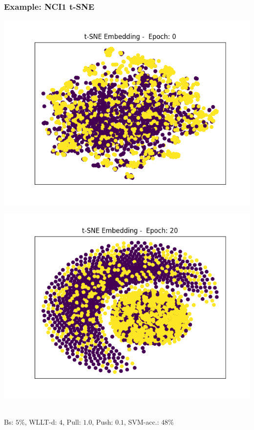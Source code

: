\begin{frame}\frametitle{Example: NCI1 t-SNE}
	\begin{minipage}{0.49\textwidth}
		\includegraphics[width=\textwidth]{images/plot10tSNE}
	\end{minipage}
	\begin{minipage}{0.49\textwidth}
		\includegraphics[width=\textwidth]{images/plot11tSNE}
	\end{minipage}
	\vspace{2cm} \\
	\tiny{Bs: $5\%$, WLLT-d: $4$, Pull: $1.0$, Push: $0.1$, SVM-acc.: $48\%$}
\end{frame}

